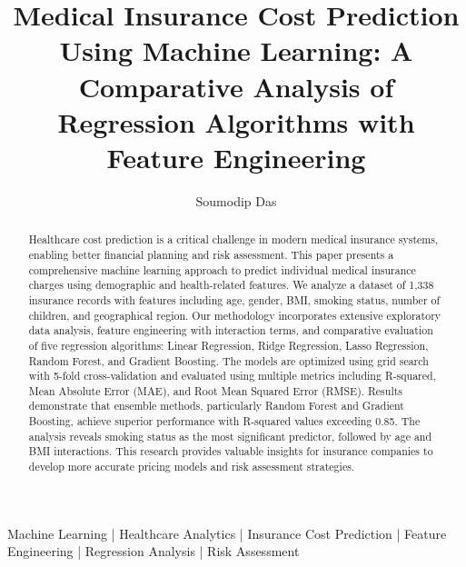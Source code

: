 \documentclass[times, twoside, watermark]{zHenriquesLab-StyleBioRxiv}
\begin{document}
\title{Medical Insurance Cost Prediction Using Machine Learning: A Comparative Analysis of Regression Algorithms with Feature Engineering}

\author[1,\Letter]{Soumodip Das}


\maketitle

\begin{abstract}
Healthcare cost prediction is a critical challenge in modern medical insurance systems, enabling better financial planning and risk assessment. This paper presents a comprehensive machine learning approach to predict individual medical insurance charges using demographic and health-related features. We analyze a dataset of 1,338 insurance records with features including age, gender, BMI, smoking status, number of children, and geographical region. Our methodology incorporates extensive exploratory data analysis, feature engineering with interaction terms, and comparative evaluation of five regression algorithms: Linear Regression, Ridge Regression, Lasso Regression, Random Forest, and Gradient Boosting. The models are optimized using grid search with 5-fold cross-validation and evaluated using multiple metrics including R-squared, Mean Absolute Error (MAE), and Root Mean Squared Error (RMSE). Results demonstrate that ensemble methods, particularly Random Forest and Gradient Boosting, achieve superior performance with R-squared values exceeding 0.85. The analysis reveals smoking status as the most significant predictor, followed by age and BMI interactions. This research provides valuable insights for insurance companies to develop more accurate pricing models and risk assessment strategies.
\end{abstract}

\begin{keywords}
Machine Learning | Healthcare Analytics | Insurance Cost Prediction | Feature Engineering | Regression Analysis | Risk Assessment
\end{keywords}
\end{document}

